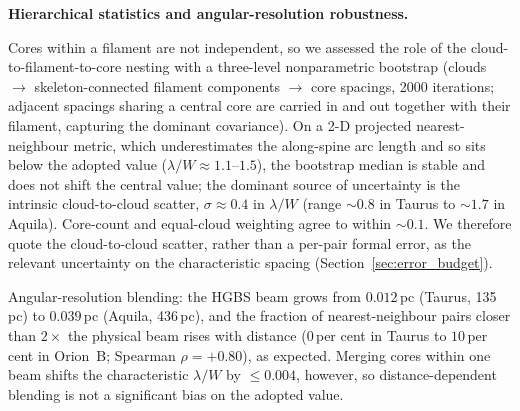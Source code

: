 \documentclass[usenatbib,twoside,twocolumn]{mnras}
\begin{document}
\smallskip\noindent\textbf{Hierarchical statistics and angular-resolution robustness.}

Cores within a filament are not independent, so we assessed the role of the cloud-to-filament-to-core nesting with a three-level nonparametric bootstrap (clouds $\to$ skeleton-connected filament components $\to$ core spacings, 2000 iterations; adjacent spacings sharing a central core are carried in and out together with their filament, capturing the dominant covariance). On a 2-D projected nearest-neighbour metric, which underestimates the along-spine arc length and so sits below the adopted value ($\lambda/W\approx1.1$--$1.5$), the bootstrap median is stable and does not shift the central value; the dominant source of uncertainty is the intrinsic cloud-to-cloud scatter, $\sigma\approx0.4$ in $\lambda/W$ (range $\sim0.8$ in Taurus to $\sim1.7$ in Aquila). Core-count and equal-cloud weighting agree to within $\sim0.1$. We therefore quote the cloud-to-cloud scatter, rather than a per-pair formal error, as the relevant uncertainty on the characteristic spacing (Section~\ref{sec:error_budget}).

Angular-resolution blending: the HGBS beam grows from $0.012$\,pc (Taurus, 135\,pc) to $0.039$\,pc (Aquila, 436\,pc), and the fraction of nearest-neighbour pairs closer than $2\times$ the physical beam rises with distance ($0$\,per cent in Taurus to $10$\,per cent in Orion~B; Spearman $\rho=+0.80$), as expected. Merging cores within one beam shifts the characteristic $\lambda/W$ by $\le0.004$, however, so distance-dependent blending is not a significant bias on the adopted value.
\end{document}

